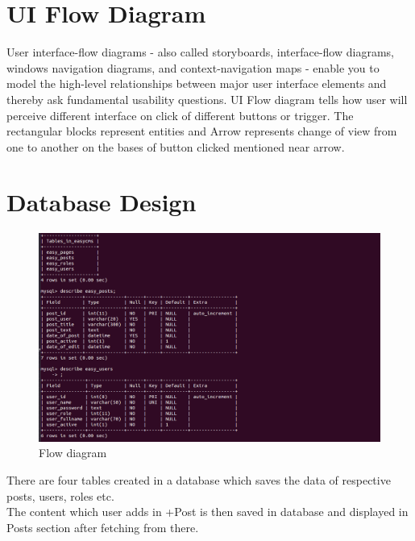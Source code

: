 \section{UI Flow Diagram}
User interface-flow diagrams - also called storyboards, interface-flow diagrams, windows navigation diagrams, and context-navigation maps - enable you to model the high-level relationships between major user interface elements and thereby ask fundamental usability questions. UI Flow diagram tells how user will perceive different interface on click of different buttons or trigger. The rectangular blocks represent entities and Arrow represents change of view from one to another on the bases of button clicked mentioned near arrow. 

\newpage
\section{Database Design}
\begin{figure}[h!]
\centering \includegraphics[scale=0.45]{input/images/data.png}
\caption{ Flow diagram}
\label{fig:UI1}
\end{figure}

There are four tables created in a database which saves the data of respective posts, users, roles etc.\\
The content which user adds in +Post is then saved in database and displayed in Posts section after fetching from there.
\newpage

